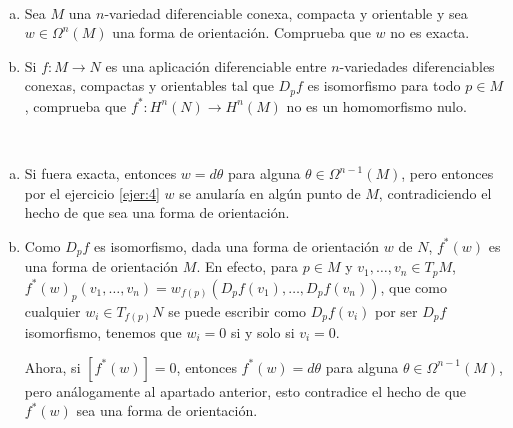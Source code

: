 \documentclass[twoside]{article}
\begin{document}
\newpage

\begin{ejercicio}{5}\
\begin{enumerate}[a)]
\item Sea $M$ una $n$-variedad diferenciable conexa, compacta y orientable y sea $w\in\Omega^n(M)$ una forma de orientación. Comprueba que $w$ no es exacta.
\item Si $f:M\to N$ es una aplicación diferenciable entre $n$-variedades diferenciables conexas, compactas y orientables tal que $D_pf$ es isomorfismo para todo $p\in M$, comprueba que $f^*:H^n(N)\to H^n(M)$ no es un homomorfismo nulo.
\end{enumerate}

\end{ejercicio}
\begin{solucion}\
\begin{enumerate}[a)]
\item Si fuera exacta, entonces $w=d\theta$ para alguna $\theta\in \Omega^{n-1}(M)$, pero entonces por el ejercicio \ref{ejer:4} $w$ se anularía en algún punto de $M$, contradiciendo el hecho de que sea una forma de orientación.
\item Como $D_pf$ es isomorfismo, dada una forma de orientación $w$ de $N$, $f^*(w)$ es una forma de orientación $M$. En efecto, para $p\in M$ y $v_1,\dots, v_n\in T_pM$, $f^*(w)_p(v_1,\dots, v_n)=w_{f(p)}(D_pf(v_1), \dots, D_pf(v_n))$, que como cualquier $w_i\in T_{f(p)}N$ se puede escribir como $D_pf(v_i)$ por ser $D_pf$ isomorfismo, tenemos que $w_i=0$ si y solo si $v_i=0$.

Ahora, si $[f^*(w)]=0$, entonces $f^*(w)=d\theta$ para alguna $\theta\in \Omega^{n-1}(M)$, pero análogamente al apartado anterior, esto contradice el hecho de que $f^*(w)$ sea una forma de orientación.
\end{enumerate}
\end{solucion}
\end{document}
